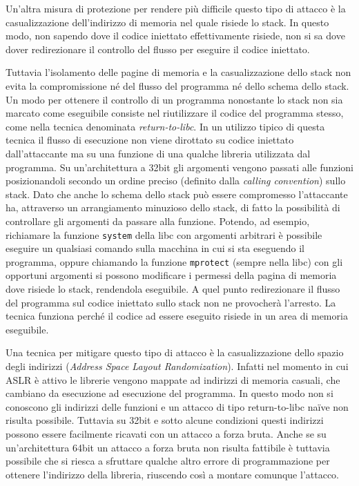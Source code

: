 Un'altra misura di protezione per rendere più difficile questo tipo di
attacco è la casualizzazione dell'indirizzo di memoria nel quale
risiede lo stack. In questo modo, non sapendo dove il codice iniettato
effettivamente risiede, non si sa dove dover redirezionare il
controllo del flusso per eseguire il codice iniettato.

Tuttavia l'isolamento delle pagine di memoria e la casualizzazione
dello stack non evita la compromissione né del flusso del programma né
dello schema dello stack. Un modo per ottenere il controllo di un
programma nonostante lo stack non sia marcato come eseguibile consiste
nel riutilizzare il codice del programma stesso, come nella tecnica
denominata \emph{return-to-libc}\cite{c0ntex,
  solar-return-to-libc}. In un utilizzo tipico di questa tecnica il
flusso di esecuzione non viene dirottato su codice iniettato
dall'attaccante ma su una funzione di una qualche libreria utilizzata
dal programma. Su un'architettura a 32bit gli argomenti vengono
passati alle funzioni posizionandoli secondo un ordine preciso
(definito dalla \emph{calling convention}) sullo stack. Dato che anche
lo schema dello stack può essere compromesso l'attaccante ha,
attraverso un arrangiamento minuzioso dello stack, di fatto la
possibilità di controllare gli argomenti da passare alla
funzione. Potendo, ad esempio, richiamare la funzione
\lstinline{system} della libc con argomenti arbitrari è possibile
eseguire un qualsiasi comando sulla macchina in cui si sta eseguendo
il programma, oppure chiamando la funzione \lstinline{mprotect}
(sempre nella libc) con gli opportuni argomenti si possono modificare
i permessi della pagina di memoria dove risiede lo stack, rendendola
eseguibile. A quel punto redirezionare il flusso del programma sul
codice iniettato sullo stack non ne provocherà l'arresto. La tecnica
funziona perché il codice ad essere eseguito risiede in un area di
memoria eseguibile. 

Una tecnica per mitigare questo tipo di attacco è la casualizzazione
dello spazio degli indirizzi (\emph{Address Space Layout
  Randomization}). Infatti nel momento in cui ASLR è attivo le
librerie vengono mappate ad indirizzi di memoria casuali, che cambiano
da esecuzione ad esecuzione del programma. In questo modo non si
conoscono gli indirizzi delle funzioni e un attacco di tipo
return-to-libc naïve non risulta possibile. Tuttavia su 32bit e sotto
alcune condizioni questi indirizzi possono essere facilmente ricavati
con un attacco a forza bruta\cite{Shacham:2004}. Anche se su
un'architettura 64bit un attacco a forza bruta non risulta fattibile è
tuttavia possibile che si riesca a sfruttare qualche altro errore di
programmazione per ottenere l'indirizzo della libreria, riuscendo così
a montare comunque l'attacco.

